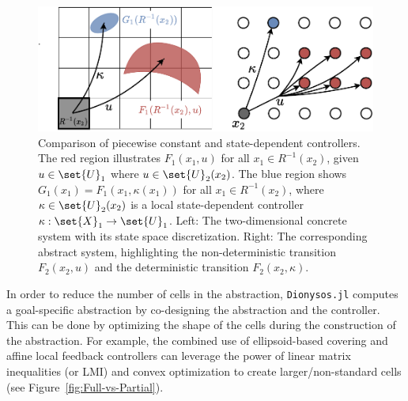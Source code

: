\documentclass{juliacon}
\begin{document}
\begin{figure}[t]
    \centerline{\includegraphics[width=\linewidth, trim=25 0 0 0, clip]{Figures/Abstraction/piece_wise_input.pdf}}
    \caption{
    \color{red} Comparison of piecewise constant and state-dependent controllers.
    The red region illustrates $F_1(x_1, u)$ for all $x_1 \in R^{-1}(x_2)$, given $u \in \set{U}_1$ where $u \in \set{U}_2(x_2)$. The blue region shows $G_1(x_1) = F_1(x_1, \kappa(x_1))$ for all $x_1\in R^{-1}(x_2)$, where $\kappa \in \set{U}_2(x_2)$ is a local state-dependent controller $\kappa:\set{X}_1\rightarrow\set{U}_1$.
    Left: The two-dimensional concrete system with its state space discretization.
    Right: The corresponding abstract system, highlighting the non-deterministic transition $F_2(x_2,u)$ and the deterministic transition $F_2(x_2,\kappa)$.\color{black}}
	\label{fig:Piece-wise-input}
\end{figure}

\vskip 6pt
In order to reduce the number of cells in the abstraction, \texttt{Dionysos.jl} computes a goal-specific abstraction by co-designing the abstraction and the controller.
This can be done by optimizing the shape of the cells 
during the construction of the abstraction.
For example, the combined use of ellipsoid-based covering and affine local feedback controllers can leverage the power of linear matrix inequalities (or LMI) and convex optimization to create larger/non-standard cells (see Figure~\ref{fig:Full-vs-Partial}).
\end{document}
